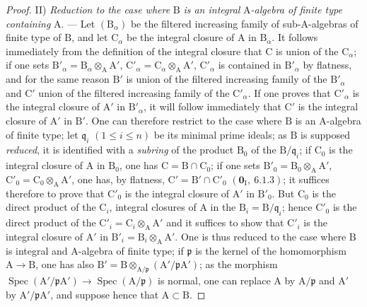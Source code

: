 \begin{proof}
II) \emph{Reduction to the case where} $\mathrm{B}$ \emph{is an integral} $\mathrm{A}$\emph{-algebra of finite type containing} $\mathrm{A}$. --- Let $(\mathrm{B}_\alpha)$
be the filtered increasing family of sub-$\mathrm{A}$-algebras of finite type of $\mathrm{B}$, and let $\mathrm{C}_\alpha$ be the integral
closure of $\mathrm{A}$ in $\mathrm{B}_\alpha$. It follows immediately from the definition of the integral closure that $\mathrm{C}$
is union of the $\mathrm{C}_\alpha$; if one sets $\mathrm{B}'_\alpha=\mathrm{B}_\alpha\otimes_\mathrm{A}\mathrm{A}'$, $\mathrm{C}'_\alpha=\mathrm{C}_\alpha\otimes_\mathrm{A}\mathrm{A}'$, $\mathrm{C}'_\alpha$ is contained in $\mathrm{B}'_\alpha$
by flatness, and for the same reason $\mathrm{B}'$ is union of the filtered increasing family of the
$\mathrm{B}'_\alpha$ and $\mathrm{C}'$ union of the filtered increasing family of the $\mathrm{C}'_\alpha$. If one proves that $\mathrm{C}'_\alpha$
is the integral closure of $\mathrm{A}'$ in $\mathrm{B}'_\alpha$, it will follow immediately that $\mathrm{C}'$ is the integral
closure of $\mathrm{A}'$ in $\mathrm{B}'$. One can therefore restrict to the case where $\mathrm{B}$ is an $\mathrm{A}$-algebra of
finite type; let $\mathfrak{q}_i$ $(1\leqslant i\leqslant n)$ be its minimal prime ideals; as $\mathrm{B}$
is supposed \emph{reduced}, it is identified with a \emph{subring} of the product $\mathrm{B}_0$ of the $\mathrm{B}/\mathfrak{q}_i$; if $\mathrm{C}_0$ is the integral closure of $\mathrm{A}$ in $\mathrm{B}_0$, one has $\mathrm{C}=\mathrm{B}\cap\mathrm{C}_0$; if one sets $\mathrm{B}'_0=\mathrm{B}_0\otimes_\mathrm{A}\mathrm{A}'$, $\mathrm{C}'_0=\mathrm{C}_0\otimes_\mathrm{A}\mathrm{A}'$, one has,
by flatness, $\mathrm{C}'=\mathrm{B}'\cap\mathrm{C}'_0$ $(\mathbf{0}_\mathrm{I},~6.1.3)$; it suffices therefore to prove that $\mathrm{C}'_0$ is the integral
closure of $\mathrm{A}'$ in $\mathrm{B}'_0$. But $\mathrm{C}_0$ is the direct product of the $\mathrm{C}_i$, integral closures of $\mathrm{A}$ in the $\mathrm{B}_i=\mathrm{B}/\mathfrak{q}_i$; hence $\mathrm{C}'_0$ is the direct product of the $\mathrm{C}'_i=\mathrm{C}_i\otimes_\mathrm{A}\mathrm{A}'$ and it suffices to show that $\mathrm{C}'_i$ is the integral closure of $\mathrm{A}'$ in $\mathrm{B}'_i=\mathrm{B}_i\otimes_\mathrm{A}\mathrm{A}'$. One is thus reduced to the case where $\mathrm{B}$ is integral and $\mathrm{A}$-algebra of finite type; if $\mathfrak{p}$ is the kernel of the homomorphism $\mathrm{A}\to\mathrm{B}$, one has also $\mathrm{B}'=\mathrm{B}\otimes_{\mathrm{A}/\mathfrak{p}}(\mathrm{A}'/\mathfrak{p}\mathrm{A}')$; as the morphism $\operatorname{Spec}(\mathrm{A}'/\mathfrak{p}\mathrm{A}')\to\operatorname{Spec}(\mathrm{A}/\mathfrak{p})$ is normal, one can replace $\mathrm{A}$ by $\mathrm{A}/\mathfrak{p}$ and $\mathrm{A}'$ by $\mathrm{A}'/\mathfrak{p}\mathrm{A}'$, and suppose hence that $\mathrm{A}\subset\mathrm{B}$.


\end{proof}
